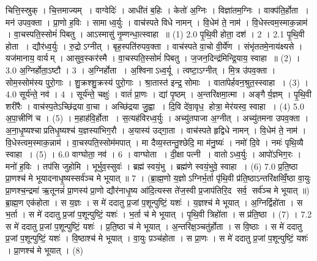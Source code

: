 
%
\setcounter{anuvakam}{0}
चित्ति॒स्स्रुक् । चि॒त्तमाज्यम् । वाग्वेदिः॑ । आधी॑तं ब॒\ar{}हिः । केतो॑ अ॒ग्निः । विज्ञा॑तम॒ग्निः । वाक्प॑ति॒र्\mbox{}होता । मन॑ उपव॒क्ता । प्रा॒णो ह॒विः । सामाध्व॒र्युः । वाच॑स्पते विधे नामन् । वि॒धेम॑ ते॒ नाम॑ । वि॒धेस्त्वम॒स्माक॒न्नाम॑ । वा॒चस्पति॒स्सोमं॑ पिबतु । आऽस्मासु॑ नृ॒म्णन्धा॒त्स्वाहा ॥ (1)
2.0
पृ॒थि॒वी होता॒ दश॑ । 2 ।
2.1
पृ॒थि॒वी होता । द्यौर॑ध्व॒र्युः । रु॒द्रोऽग्नीत् । बृह॒स्पति॑रुपव॒क्ता । वाच॑स्पते वा॒चो वी॒र्ये॑ण । संभृ॑ततमे॒नाय॑क्ष्यसे । यज॑मानाय॒ वार्यम् । आसुव॒स्कर॑स्मै । वा॒चस्पति॒स्सोमं॑ पिबतु । ज॒जन॒दिन्द्र॑मिन्द्रि॒याय॒ स्वाहा ॥ (2) ।
3.0
अ॒ग्निर्होता॒ऽष्टौ । 3 ।
अ॒ग्निर्\mbox{}होता । अ॒श्विनाऽध्व॒र्यू । त्वष्टा॒ऽग्नीत् । मि॒त्र उ॑पव॒क्ता । सोम॒स्सोम॑स्य पुरो॒गाः । शु॒क्रश्शु॒क्रस्य॑ पुरो॒गाः । श्रा॒तास्त॑ इन्द्र॒ सोमाः । वाता॑पेर्\mbox{}हवन॒श्रुत॒स्स्वाहा । (3) ।
4.0
सूर्य॑न्ते॒ नव॑ । 4 ।
सूर्य॑न्ते॒ चक्षुः॑ । वातं॑ प्रा॒णः । द्यां पृ॒ष्ठम् । अ॒न्तरि॑क्षमा॒त्मा । अङ्गैर्य॒ज्ञम् । पृ॒थि॒वी शरी॑रैः । वाच॑स्प॒तेऽच्छि॑द्रया वा॒चा । अच्छि॑द्रया जु॒ह्वा । दि॒वि दे॑वा॒वृध॒ होत्रा॒ मेर॑यस्व॒ स्वाहा । (4)
5.0
अ॒पा॒त्त्रीणि॑ च । (5) ।
म॒हाह॑वि॒र्\mbox{}होता । स॒त्यह॑विरध्व॒र्युः । अच्यु॑तपाजा अ॒ग्नीत् । अच्यु॑तमना उपव॒क्ता । अ॒ना॒धृ॒ष्यश्चाप्रतिधृ॒ष्यश्च॑ य॒ज्ञस्या॑भिग॒रौ । अ॒यास्य॑ उद्गा॒ता । वाच॑स्पते हृद्विधे नामन् । वि॒धेम॑ ते॒ नाम॑ । वि॒धेस्त्वम॒स्माक॒न्नाम॑ । वा॒चस्पति॒स्सोम॑मपात् । मा दैव्य॒स्तन्तु॒श्छेदि॒ मा म॑नु॒ष्यः॑ । नमो॑ दि॒वे । नमः॑ पृथि॒व्यै स्वाहा । (5) ।
6.0
वाग्घोता॒ नव॑ । 6 ।
वाग्घोता । दी॒क्षा पत्नी । वातोऽध्व॒र्युः । आपो॑ऽभिग॒रः । मनो॑ ह॒विः । तप॑सि जुहोमि । भूर्भुव॒स्सुवः॑ । ब्रह्म॑ स्वयं॒भु । ब्रह्म॑णे स्वयं॒भुवे॒ स्वाहा । (6)
7.0
प्र॒ति॒ष्ठा प्रा॒णश्च॑ मे भूयादनाधृ॒ष्यस्सर्व॑ञ्च मे भूयात् ॥ 7 । (ब्रा॒ह्म॒णो य॒ज्ञोऽग्निर्भ॒र्ता पृ॑थि॒वी प्र॑ति॒ष्ठाऽन्तरि॑क्षव्विँ॒ष्ठा वा॒युः प्रा॒णश्च॒न्द्रमा॑ ऋ॒तूनन्नं॑ प्रा॒णस्य॑ प्रा॒णो द्यौर॑नाधृ॒ष्य आ॑दि॒त्यस्स ते॑ज॒स्वी प्र॒जाप॑तिरि॒द सर्व॒ सर्व॑ञ्च मे भूयात् ॥)
ब्रा॒ह्म॒ण एक॑होता । स य॒ज्ञः । स मे॑ ददातु प्र॒जां प॒शून्पुष्टिं॒ यशः॑ । य॒ज्ञश्च॑ मे भूयात् । अ॒ग्निर्द्विहो॑ता । स भ॒र्ता । स मे॑ ददातु प्र॒जां प॒शून्पुष्टिं॒ यशः॑ । भ॒र्ता च॑ मे भूयात् । पृ॒थि॒वी त्रिहो॑ता । स प्र॑ति॒ष्ठा । (7) ।
7.2
स मे॑ ददातु प्र॒जां प॒शून्पुष्टिं॒ यशः॑ । प्र॒ति॒ष्ठा च॑ मे भूयात् । अ॒न्तरि॑क्ष॒ञ्चतु॑र्\mbox{}होता । स वि॒ष्ठाः । स मे॑ ददातु प्र॒जां प॒शून्पुष्टिं॒ यशः॑ । वि॒ष्ठाश्च॑ मे भूयात् । वा॒युः प़ञ्च॑होता । स प्रा॒णः । स मे॑ ददातु प्र॒जां प॒शून्पुष्टिं॒ यशः॑ । प्रा॒णश्च॑ मे भूयात् । (8)
